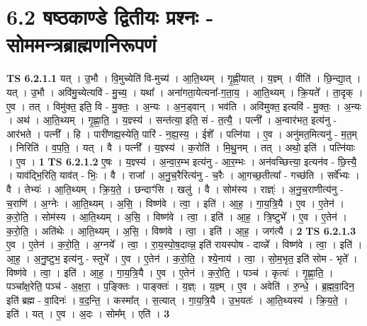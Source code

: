 \documentclass[17pt]{extarticle}
\begin{document}
\section*{ 6.2       षष्ठकाण्डे द्वितीयः प्रश्नः - सोममन्त्रब्राह्मणनिरूपणं }
                                \textbf{ TS 6.2.1.1} \newline
                  यत् । उ॒भौ । वि॒मुच्येति॑ वि-मुच्य॑ । आ॒ति॒थ्यम् । गृ॒ह्णी॒यात् । य॒ज्ञ्म् । वीति॑ । छि॒न्द्या॒त् । यत् । उ॒भौ । अवि॑मु॒च्येत्यवि॑ - मु॒च्य॒ । यथा᳚ । अना॑गता॒येत्यना᳚-ग॒ता॒य॒ । आ॒ति॒थ्यम् । क्रि॒यते᳚ । ता॒दृक् । ए॒व । तत् । विमु॑क्त॒ इति॒ वि - मु॒क्तः॒ । अ॒न्यः । अ॒न॒ड्वान् । भव॑ति । अवि॑मुक्त॒ इत्यवि॑ - मु॒क्तः॒ । अ॒न्यः । अथ॑ । आ॒ति॒थ्यम् । गृ॒ह्णा॒ति॒ । य॒ज्ञ्स्य॑ । सन्त॑त्या॒ इति॒ सं - त॒त्यै॒ । पत्नी᳚ । अ॒न्वार॑भत॒ इत्य॑नु - आर॑भते । पत्नी᳚ । हि । पारी॑णह्य॒स्येति॒ पारि॑ - न॒ह्य॒स्य॒ । ईशे᳚ । पत्नि॑या । ए॒व । अनु॑मत॒मित्यनु॑ - म॒त॒म् । निरिति॑ । व॒प॒ति॒ । यत् । वै । पत्नी᳚ । य॒ज्ञ्स्य॑ । क॒रोति॑ । मि॒थु॒नम् । तत् । अथो॒ इति॑ । पत्नि॑याः । ए॒व । \textbf{  1} \newline
                  \newline
                                \textbf{ TS 6.2.1.2} \newline
                  ए॒षः । य॒ज्ञ्स्य॑ । अ॒न्वा॒र॒म्भ इत्य॑नु -  आ॒र॒म्भः । अन॑वच्छित्त्या॒ इत्यन॑व - छि॒त्त्यै॒ । याव॑द्भि॒रिति॒ याव॑त् - भिः॒ । वै । राजा᳚ । अ॒नु॒च॒रैरित्य॑नु - च॒रैः । आ॒गच्छ॒तीत्या᳚ - गच्छ॑ति । सर्वे᳚भ्यः । वै । तेभ्यः॑ । आ॒ति॒थ्यम् । क्रि॒य॒ते॒ । छन्दाꣳ॑सि । खलु॑ । वै । सोम॑स्य । राज्ञ्ः॑ । अ॒नु॒च॒राणीत्य॑नु - च॒राणि॑ । अ॒ग्नेः । आ॒ति॒थ्यम् । अ॒सि॒ । विष्ण॑वे । त्वा॒ । इति॑ । आ॒ह॒ । गा॒य॒त्रि॒यै । ए॒व । ए॒तेन॑ । क॒रो॒ति॒ । सोम॑स्य । आ॒ति॒थ्यम् । अ॒सि॒ । विष्ण॑वे । त्वा॒ । इति॑ । आ॒ह॒ । त्रि॒ष्टुभे᳚ । ए॒व । ए॒तेन॑ । क॒रो॒ति॒ । अति॑थेः । आ॒ति॒थ्यम् । अ॒सि॒ । विष्ण॑वे । त्वा॒ । इति॑ । आ॒ह॒ । जग॑त्यै । \textbf{  2} \newline
                  \newline
                                \textbf{ TS 6.2.1.3} \newline
                  ए॒व । ए॒तेन॑ । क॒रो॒ति॒ । अ॒ग्नये᳚ । त्वा॒ । रा॒य॒स्पो॒ष॒दाव्न्न॒ इति॑ रायस्पोष - दाव्न्ने᳚ । विष्ण॑वे । त्वा॒ । इति॑ । आ॒ह॒ । अ॒नु॒ष्टुभ॒ इत्य॑नु - स्तुभे᳚ । ए॒व । ए॒तेन॑ । क॒रो॒ति॒ । श्ये॒नाय॑ । त्वा॒ । सो॒म॒भृत॒ इति॑ सोम - भृते᳚ । विष्ण॑वे । त्वा॒ । इति॑ । आ॒ह॒ । गा॒य॒त्रि॒यै । ए॒व । ए॒तेन॑ । क॒रो॒ति॒ । पञ्च॑ । कृत्वः॑ । गृ॒ह्णा॒ति॒ । पञ्चा᳚क्ष॒रेति॒ पञ्च॑ - अ॒क्ष॒रा॒ । प॒ङ्क्तिः । पाङ्क्तः॑ । य॒ज्ञ्ः । य॒ज्ञ्म् । ए॒व । अवेति॑ । रु॒न्धे॒ । ब्र॒ह्म॒वा॒दिन॒ इति॑ ब्रह्म - वा॒दिनः॑ । व॒द॒न्ति॒ । कस्मा᳚त् । स॒त्यात् । गा॒य॒त्रि॒यै । उ॒भ॒यतः॑ । आ॒ति॒थ्यस्य॑ । क्रि॒य॒ते॒ । इति॑ । यत् । ए॒व । अ॒दः । सोम᳚म् । एति॑ । \textbf{  3} \newline
\end{document}
